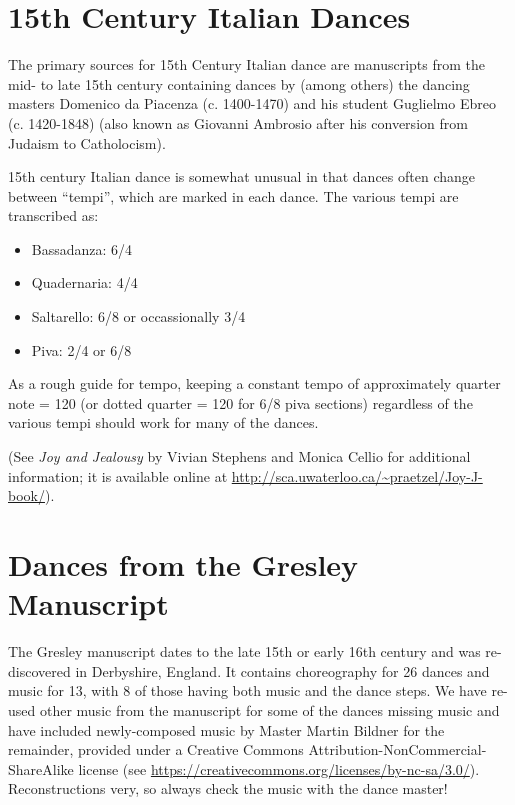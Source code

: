 \documentclass[11pt]{book}
\begin{document}


\chapter{15th Century Italian Dances}

The primary sources for 15th Century Italian dance are manuscripts from the
mid- to late 15th century containing dances by (among others) the dancing
masters Domenico da Piacenza (c. 1400-1470) and his student Guglielmo Ebreo (c.
1420-1848) (also known as Giovanni Ambrosio after his conversion from Judaism
to Catholocism).

15th century Italian dance is somewhat unusual in that dances often change
between ``tempi'', which are marked in each dance. The various tempi are
transcribed as:

\begin{itemize}

\item Bassadanza: 6/4
\item Quadernaria: 4/4
\item Saltarello: 6/8 or occassionally 3/4
\item Piva: 2/4 or 6/8

\end{itemize}

As a rough guide for tempo, keeping a constant tempo of approximately quarter
note = 120 (or dotted quarter = 120 for 6/8 piva sections) regardless of the
various tempi should work for many of the dances.

(See {\em Joy and Jealousy} by Vivian Stephens and Monica Cellio for additional
information; it is available online at
\url{http://sca.uwaterloo.ca/~praetzel/Joy-J-book/}). 




\chapter{Dances from the Gresley Manuscript}

The Gresley manuscript dates to the late 15th or early 16th century and was
re-discovered in Derbyshire, England. It contains choreography for 26 dances
and music for 13, with 8 of those having both music and the dance steps. We
have re-used other music from the manuscript for some of the dances missing
music and have included newly-composed music by Master Martin Bildner for the remainder, provided
under a Creative Commons Attribution-NonCommercial-ShareAlike license (see 
\url{https://creativecommons.org/licenses/by-nc-sa/3.0/}).
Reconstructions very, so always check the music with the dance master!
\end{document}
